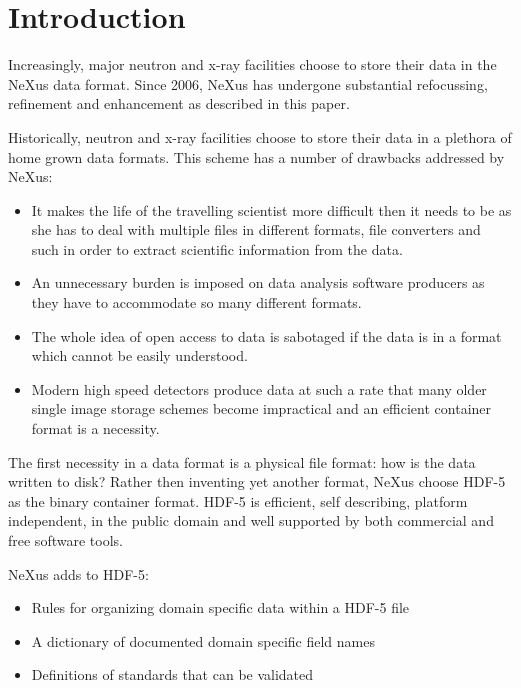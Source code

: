 \documentclass[%
 aip,
rsi,
 amsmath,amssymb,
 reprint,%
]{revtex4-1}
\begin{document}
\maketitle


\section{Introduction}
Increasingly, major neutron and x-ray facilities choose to store their data in the NeXus data format. 
Since 2006, NeXus\cite{nxold} has undergone substantial refocussing, 
refinement and enhancement as described in this paper.  

Historically, neutron and x-ray facilities choose to store their data in a plethora of 
home grown data formats. This scheme has a number of drawbacks addressed by NeXus: 
\begin{itemize}
\item It makes the life of the travelling scientist more difficult then it needs to be as she has to deal with multiple files 
 in different formats, file converters and such in order to extract scientific information from the data.
 \item An unnecessary burden is imposed on data analysis software producers as they have to accommodate so many different formats.  
\item The whole idea of open access to data is sabotaged if the data is in a format which cannot be easily understood.
\item Modern high speed detectors produce data at such a rate that many older single image storage schemes become impractical and 
 an efficient container format is a necessity. 
\end{itemize}

The first necessity in a data format is a physical file format: how is the data written to disk? Rather then inventing  
yet another format, NeXus choose HDF-5\cite{hdf5} as the binary container format. HDF-5 is efficient, self describing, 
platform independent, in the public domain and well supported by both commercial and free software tools. 

NeXus adds to HDF-5:
\begin{itemize}
\item Rules for organizing domain specific data within a HDF-5 file
\item A dictionary of documented domain specific field names
\item Definitions of standards that can be validated
\end{itemize}
\end{document}
